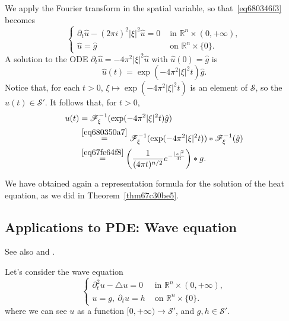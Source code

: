 \documentclass[a4paper,9pt]{amsart}
\newcommand{\scr}[1]{\mathscr{#1}}
\newcommand{\R}{\mathbb{R}}	%
\newcommand{\de}{\partial}		%
\newcommand{\laplacian}{\triangle}
\theoremstyle{plain}
\theoremstyle{definition}
\theoremstyle{remark}
\begin{document}
We apply the Fourier transform in the spatial variable, so that~\eqref{eq680346f3} becomes
\begin{equation}\label{eq6803470c}
\begin{cases}
	\de_t \hat u - (2\pi i)^2 |\xi|^2 \hat u = 0 & \text{ in }\R^n\times(0,+\infty) ,\\
	\hat u = \hat g & \text{ on } \R^n\times\{0\} .
\end{cases}
\end{equation}
A solution to the ODE $\de_t\hat u = -4\pi^2 |\xi|^2 \hat u$ with $\hat u(0)=\hat g$ is
\begin{equation}
	\hat u(t) =  \exp(-4\pi^2|\xi|^2 t) \hat g .
\end{equation}
Notice that, for each $t>0$, $\xi\mapsto \exp(-4\pi^2|\xi|^2 t)$ is an element of $\scr S$,
so the $\hat u(t)\in\scr S'$.
It follows that, for $t>0$, 
\begin{align}
	u(t) 
	&= \scr F^{-1}_\xi (\exp(-4\pi^2|\xi|^2 t) \hat g) \\
	&\overset{\eqref{eq680350a7}}= \scr F^{-1}_\xi (\exp(-4\pi^2|\xi|^2 t) ) * \scr F^{-1}_\xi(\hat g) \\
	&\overset{\eqref{eq67fe64f8}}= \left( \frac1{(4\pi t)^{n/2}} e^{-\frac{|x|^2}{4t}} \right) * g .
\end{align}

We have obtained again a representation formula for the solution of the heat equation, as we did in Theorem~\ref{thm67c30be5}.

\subsection{Applications to PDE: Wave equation}%
See also \cite[\S5.D,p.177]{MR1357411} and \cite[p.194]{MR2597943}.

Let's consider the wave equation
\begin{equation}\label{eq6803521d}
\begin{cases}
	\de_t^2 u - \laplacian u = 0 & \text{ in }\R^n\times(0,+\infty) ,\\
	u = g,\ \de_tu = h & \text{ on } \R^n\times\{0\} .
\end{cases}
\end{equation}
where we can see $u$ as a function $[0,+\infty)\to \scr S'$, and $g,h\in\scr S'$.
\end{document}
